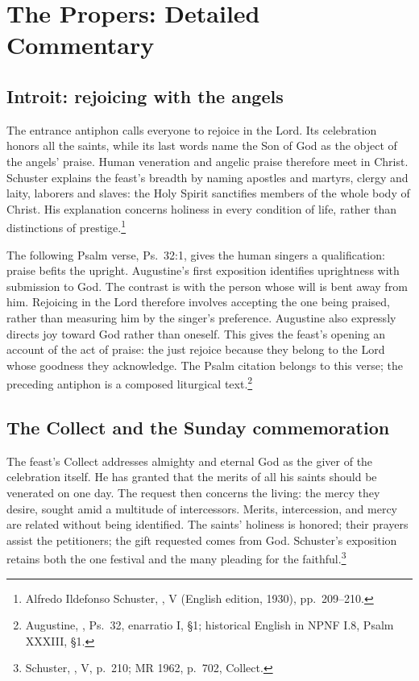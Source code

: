 \section{The Propers: Detailed Commentary}

\subsection{Introit: rejoicing with the angels}
The entrance antiphon calls everyone to rejoice in the Lord. Its celebration
honors all the saints, while its last words name the Son of God as the object
of the angels' praise. Human veneration and angelic praise therefore meet in
Christ. Schuster explains the feast's breadth by naming apostles and martyrs,
clergy and laity, laborers and slaves: the Holy Spirit sanctifies members of
the whole body of Christ. His explanation concerns holiness in every condition
of life, rather than distinctions of prestige.\footnote{Alfredo Ildefonso
Schuster, , V (English edition, 1930), pp.~209--210.}

The following Psalm verse, Ps.~32:1, gives the human singers a qualification:
praise befits the upright. Augustine's first exposition identifies uprightness
with submission to God. The contrast is with the person whose will is bent
away from him. Rejoicing in the Lord therefore involves accepting the one
being praised, rather than measuring him by the singer's preference.
Augustine also expressly directs joy toward God rather than oneself.
This gives the feast's opening an account of the act of praise: the just
rejoice because they belong to the Lord whose goodness they acknowledge.
The Psalm citation belongs to this verse; the preceding antiphon is a composed
liturgical text.\footnote{Augustine, , Ps.~32,
enarratio I, \S1; historical English in NPNF I.8, Psalm XXXIII, \S1.}

\subsection{The Collect and the Sunday commemoration}
The feast's Collect addresses almighty and eternal God as the giver of the
celebration itself. He has granted that the merits of all his saints should be
venerated on one day. The request then concerns the living: the mercy they
desire, sought amid a multitude of intercessors. Merits, intercession, and
mercy are related without being identified. The saints' holiness is honored;
their prayers assist the petitioners; the gift requested comes from God.
Schuster's exposition retains both the one festival and the many pleading for
the faithful.\footnote{Schuster, , V, p.~210; MR 1962,
p.~702, Collect.}

